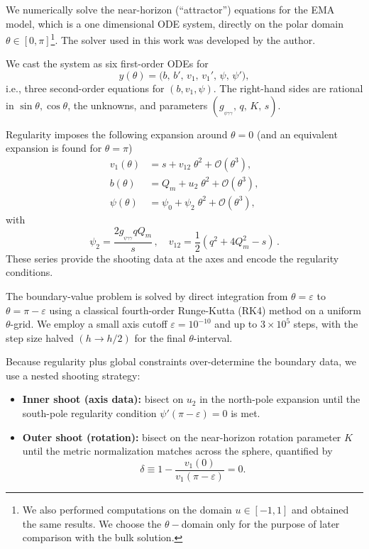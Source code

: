 \documentclass[11pt]{article}
\numberwithin{equation}{section} %
\begin{document}
 We numerically solve the near-horizon (``attractor'') equations for the EMA model, which is a one dimensional ODE system, directly on the polar domain $\theta\in[0,\pi]$\footnote{We also performed computations on the domain $u\in[-1,1]$ and obtained the same results. We choose the $\theta-$domain only for the purpose of later comparison with the bulk solution.}. The solver used in this work was developed by the author.

We cast the system as six first-order ODEs for
\begin{equation}
y(\theta)=\big(b,\,b',\,v_1,\,v_1',\,\psi,\,\psi'\big),
\end{equation}
i.e., three second-order equations for $(b,v_1,\psi)$. The right-hand sides are rational in $\sin\theta,\cos\theta$, the unknowns, and parameters $(g_{_{\psi\gamma\gamma}},\,q,\,K,\,s)$.

Regularity imposes the following expansion around $\theta=0$ (and an equivalent expansion is found for $\theta=\pi$)
\begin{align}
v_1(\theta)&=s+v_{12}\;\theta^2+\mathcal{O}(\theta^3),\\
b(\theta)&=Q_m+u_2\;\theta^2+\mathcal{O}(\theta^3),\\
\psi(\theta)&=\psi_0+\psi_2 \; \theta^2+\mathcal{O}(\theta^3),
\end{align}
with
\begin{equation}
    \psi_2=\frac{2 g_{_{\psi\gamma\gamma}} q Q_{m}}{s}\,,\quad v_{12}=\frac{1}{2} \left(q^2+4 Q_{m}^2-s\right)\,.
\end{equation}
These series provide the shooting data at the axes and encode the regularity conditions.

The boundary-value problem is solved by direct integration from $\theta=\varepsilon$ to $\theta=\pi-\varepsilon$ using a classical fourth-order Runge-Kutta (RK4) method on a uniform $\theta$-grid. We employ a small axis cutoff $\varepsilon=10^{-10}$ and up to $3\times10^5$ steps, with the step size halved $(h\rightarrow h/2)$ for the final $\theta$-interval.


Because regularity plus global constraints over-determine the boundary data, we use a nested shooting strategy:
\begin{itemize}
  \item \textbf{Inner shoot (axis data):} bisect on $u_2$ in the north-pole expansion until the south-pole regularity condition $\psi'(\pi-\varepsilon)=0$  is met.
  \item \textbf{Outer shoot (rotation):} bisect on the near-horizon rotation parameter $K$ until the metric normalization matches across the sphere, quantified by
  \[
  \delta \equiv 1 - \frac{v_1(0)}{v_1(\pi-\varepsilon)}=0.
  \]
\end{itemize}
\end{document}
